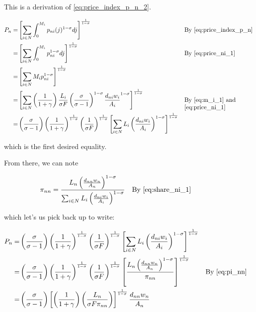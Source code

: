 \documentclass[10pt]{article}
\begin{document}
This is a derivation of \eqref{eq:price_index_p_n_2}.

\begin{align}
    P_n = &\left[\sum_{i \in N} \int_0^{M_i} p_{n i}(j)^{1-\sigma} d j\right]^{\frac{1}{1-\sigma}} && \parbox[t]{4cm}{\raggedright By \eqref{eq:price_index_p_n}} \\
    = &\left[\sum_{i \in N} \int_0^{M_i} p_{n i}^{1-\sigma} d j\right]^{\frac{1}{1-\sigma}} && \parbox[t]{4cm}{\raggedright By \eqref{eq:price_ni_1}} \\
    = &\left[\sum_{i \in N} M_i p_{n i}^{1-\sigma}\right]^{\frac{1}{1-\sigma}} \\
    = &\left[\sum_{i \in N} \left(\frac{1}{1 + \gamma}\right)\frac{L_i}{\sigma F} \left(\frac{\sigma}{\sigma-1}\right)^{1-\sigma} \frac{d_{ni} w_i}{A_i}^{1-\sigma}\right]^{\frac{1}{1-\sigma}} && \parbox[t]{4cm}{\raggedright By \eqref{eq:m_i_1} and \eqref{eq:price_ni_1}} \\
    = &\left(\frac{\sigma}{\sigma-1}\right) \left(\frac{1}{1 + \gamma}\right)^{\frac{1}{1 - \sigma}} \left(\frac{1}{\sigma F}\right)^{\frac{1}{1-\sigma}} \left[\sum_{i \in N} L_i \left(\frac{d_{ni} w_i}{A_i}\right)^{1-\sigma}\right]^{\frac{1}{1-\sigma}} \\
\end{align}

which is the first desired equality. 

From there, we can note

\begin{align}
    \pi_{nn} &= \frac{L_n \left(\frac{d_{nn} w_n}{A_n}\right)^{1-\sigma}}{\sum_{i \in N} L_i \left(\frac{d_{ni} w_i}{A_i}\right)^{1-\sigma}} && \parbox[t]{4cm}{\raggedright By \eqref{eq:share_ni_1}} \label{eq:pi_nn}
\end{align}

which let's us pick back up to write:

\begin{align}
    P_n = &\left(\frac{\sigma}{\sigma-1}\right) \left(\frac{1}{1 + \gamma}\right)^{\frac{1}{1 - \sigma}} \left(\frac{1}{\sigma F}\right)^{\frac{1}{1-\sigma}} \left[\sum_{i \in N} L_i \left(\frac{d_{ni} w_i}{A_i}\right)^{1-\sigma}\right]^{\frac{1}{1-\sigma}} \\
    = &\left(\frac{\sigma}{\sigma-1}\right) \left(\frac{1}{1 + \gamma}\right)^{\frac{1}{1 - \sigma}} \left(\frac{1}{\sigma F}\right)^{\frac{1}{1-\sigma}} \left[\frac{L_n \left(\frac{d_{nn} w_n}{A_n}\right)^{1-\sigma}}{\pi_{nn}}\right]^{\frac{1}{1-\sigma}} && \text{By \eqref{eq:pi_nn}} \\
    = &\left(\frac{\sigma}{\sigma-1}\right) \left[\left(\frac{1}{1 + \gamma}\right) \left(\frac{L_n}{\sigma F \pi_{nn}}\right)\right]^{\frac{1}{1-\sigma}} \frac{d_{nn} w_n}{A_n}
\end{align}
\end{document}
